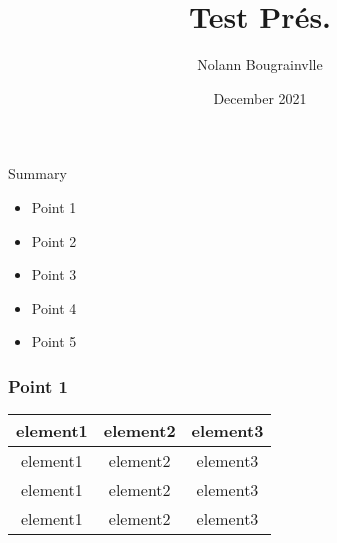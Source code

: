 \documentclass{beamer}
\title{Test Prés.}
\author{Nolann Bougrainvlle}
\institute{EPITECH}
\date{December 2021}
\begin{document}
\frame{\titlepage}

\begin{frame}{Summary}

    \begin{itemize}
        \setlength\itemsep{2em}
        \item<1-> Point 1
        \item<2-> Point 2
        \item<3-> Point 3
        \item<4-> Point 4
        \item<5-> Point 5
    \end{itemize}
\end{frame}

\begin{frame}
    \frametitle{Point 1}
    
    \begin{center}
        \begin{tabular}{|c|c|c|}
            \hline
            element1 & element2 & element3 \\
            \hline
            element1 & element2 & element3 \\
            \hline
            element1 & element2 & element3 \\
            \hline
            element1 & element2 & element3 \\
            \hline
        \end{tabular}
    \end{center}
\end{frame}
\end{document}
